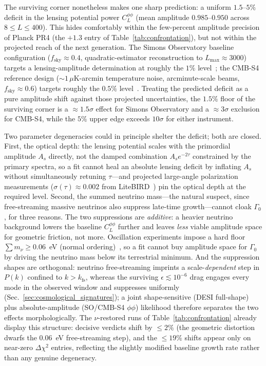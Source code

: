 \documentclass[aps,prd,twocolumn,superscriptaddress,nofootinbib]{revtex4-2}
\theoremstyle{definition}
\theoremstyle{remark}
\begin{document}
The surviving corner nonetheless makes one sharp prediction: a uniform
$1.5$--$5\%$ deficit in the lensing potential power
$C_L^{\phi\phi}$ (mean amplitude $0.985$--$0.950$ across
$8 \le L \le 400$). This hides comfortably within the few-percent
amplitude precision of Planck PR4 (the $+1.3$ entry of
Table~\ref{tab:confrontation}), but not within the projected reach of
the next generation. The Simons Observatory baseline configuration
($f_{\mathrm{sky}} \approx 0.4$, quadratic-estimator reconstruction to
$L_{\mathrm{max}} \approx 3000$) targets a lensing-amplitude
determination at roughly the $1\%$ level~\cite{SimonsObs2019}; the
CMB-S4 reference design ($\sim 1\,\mu$K-arcmin temperature noise,
arcminute-scale beams, $f_{\mathrm{sky}} \approx 0.6$) targets roughly
the $0.5\%$ level~\cite{CMBS42016}. Treating the predicted deficit as
a pure amplitude shift against those projected uncertainties, the
$1.5\%$ floor of the surviving corner is a ${\approx}1.5\sigma$ effect
for Simons Observatory and a ${\approx}3\sigma$ exclusion for CMB-S4,
while the $5\%$ upper edge exceeds $10\sigma$ for either instrument.

Two parameter degeneracies could in principle shelter the deficit;
both are closed. First, the optical depth: the lensing potential
scales with the primordial amplitude $A_s$ directly, not the damped
combination $A_s e^{-2\tau}$ constrained by the primary spectra, so a
fit cannot heal an absolute lensing deficit by inflating $A_s$ without
simultaneously retuning $\tau$---and projected large-angle
polarization measurements ($\sigma(\tau) \approx 0.002$ from
LiteBIRD~\cite{LiteBIRD2023}) pin the optical depth at the required
level. Second, the summed neutrino mass---the natural suspect, since
free-streaming massive neutrinos also suppress late-time
growth---cannot cloak $\Gamma_0$, for three reasons. The two
suppressions are \emph{additive}: a heavier neutrino background lowers
the baseline $C_L^{\phi\phi}$ further and leaves \emph{less} viable
amplitude space for geometric friction, not more. Oscillation
experiments impose a hard floor $\sum m_\nu \ge 0.06$~eV (normal
ordering)~\cite{Esteban2020}, so a fit cannot buy amplitude space for
$\Gamma_0$ by driving the neutrino mass below its terrestrial minimum.
And the suppression shapes are orthogonal: neutrino free-streaming
imprints a scale-\emph{dependent} step in $P(k)$ confined to
$k > k_{\mathrm{fs}}$, whereas the surviving
$\epsilon \lesssim 10^{-6}$ drag engages every mode in the observed
window and suppresses uniformly
(Sec.~\ref{sec:cosmological_signatures}); a joint shape-sensitive
(DESI full-shape) plus absolute-amplitude (SO/CMB-S4 $\phi\phi$)
likelihood therefore separates the two effects morphologically. The
$\nu$-restored runs of Table~\ref{tab:confrontation} already display
this structure: decisive verdicts shift by $\le 2\%$ (the geometric
distortion dwarfs the $0.06$~eV free-streaming step), and the
$\le 19\%$ shifts appear only on near-zero $\Delta\chi^2$ entries,
reflecting the slightly modified baseline growth rate rather than any
genuine degeneracy.
\end{document}

